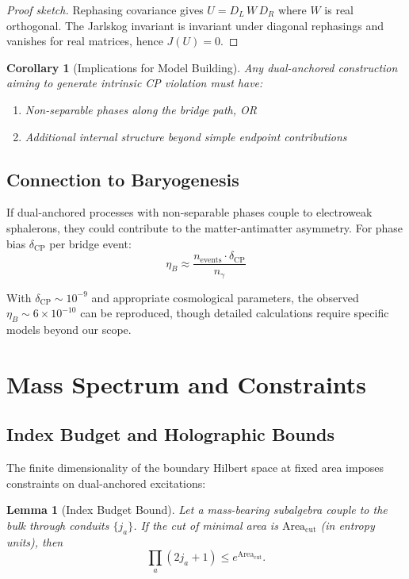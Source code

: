 \documentclass[11pt]{article}
\theoremstyle{plain}
\newtheorem{lemma}[theorem]{Lemma}
\newtheorem{corollary}[theorem]{Corollary}
\theoremstyle{definition}
\begin{document}
\begin{proof}[Proof sketch]
  Rephasing covariance gives $U=D_L\,W\,D_R$ where $W$ is real orthogonal. The Jarlskog invariant is invariant under diagonal rephasings and vanishes for real matrices, hence $J(U)=0$.
\end{proof}

\begin{corollary}[Implications for Model Building]
  Any dual-anchored construction aiming to generate intrinsic CP violation must have:
  \begin{enumerate}
    \item Non-separable phases along the bridge path, OR
    \item Additional internal structure beyond simple endpoint contributions
  \end{enumerate}
\end{corollary}

\subsection{Connection to Baryogenesis}

If dual-anchored processes with non-separable phases couple to electroweak sphalerons, they could contribute to the matter-antimatter asymmetry. For phase bias $\delta_{\text{CP}}$ per bridge event:
\begin{equation}
  \eta_B \approx \frac{n_{\text{events}} \cdot \delta_{\text{CP}}}{n_\gamma}
\end{equation}

With $\delta_{\text{CP}} \sim 10^{-9}$ and appropriate cosmological parameters, the observed $\eta_B \sim 6\times 10^{-10}$ can be reproduced, though detailed calculations require specific models beyond our scope.

\section{Mass Spectrum and Constraints}
\label{sec:mass-spectrum}

\subsection{Index Budget and Holographic Bounds}

The finite dimensionality of the boundary Hilbert space at fixed area imposes constraints on dual-anchored excitations:

\begin{lemma}[Index Budget Bound]
  Let a mass-bearing subalgebra couple to the bulk through conduits $\{j_a\}$. If the cut of minimal area is $\mathrm{Area}_{\mathrm{cut}}$ (in entropy units), then
  \begin{equation}
    \prod_a (2j_a+1) \leq e^{\mathrm{Area}_{\mathrm{cut}}}.
  \end{equation}
\end{lemma}
\end{document}
